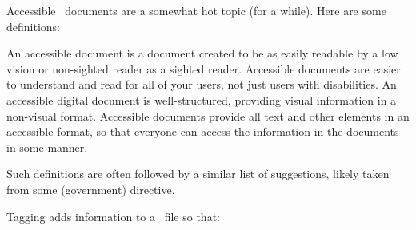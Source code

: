 





\setupbackgrounds
  [text]
  [background=extratext]


\setuptyping
  [align=hangright,
   keeptogether=paragraph,
   numbering=]

\startdocument
  [title={Accessibility},
   banner={what it is about},
   location={bachotex\enspace {\bf 2024}\enspace meeting}]

\starttitle[title=What is accessibility]

Accessible \PDF\ documents are a somewhat hot topic (for a while). Here are some
definitions:

\startitemize
\startitem
     An accessible document is a document created to be as
    easily readable by a low vision or non-sighted reader as a sighted reader.
\stopitem
\startitem
     Accessible documents are easier to understand and read
    for all of your users, not just users with disabilities.
\stopitem
\startitem
     An accessible digital
    document is well-structured, providing visual information in a non-visual
    format.
\stopitem
\startitem
     Accessible documents provide all text and other elements
    in an accessible format, so that everyone can access the information in the
    documents in some manner.
\stopitem
\stopitemize

Such definitions are often followed by a similar list of suggestions, likely taken
from some (government) directive.

\stoptitle

\starttitle[title=What is tagging]

Tagging adds information to a \PDF\ file so that:

